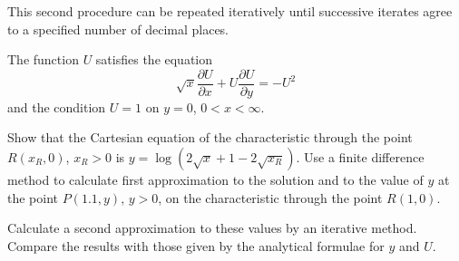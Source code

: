 \documentclass[../main-sheet.tex]{subfiles}
\begin{document}
This second procedure can be repeated iteratively until successive iterates agree to a specified number of decimal places.
\begin{ex}
    The function \(U\) satisfies the equation
    \[\sqrt{x}\frac{\partial U}{\partial x}+U\frac{\partial U}{\partial y}=-U^2\]
    and the condition \(U=1\) on \(y=0\), \(0<x<\infty\).
    
    Show that the Cartesian equation of the characteristic through the point \(R(x_R,0)\), \(x_R>0\) is \(y=\log(2\sqrt{x}+1-2\sqrt{x_R})\). Use a finite difference method to calculate first approximation to the solution and to the value of \(y\) at the point \(P(1.1,y)\), \(y>0\), on the characteristic through the point \(R(1,0)\).
    
    Calculate a second approximation to these values by an iterative method. Compare the results with those given by the analytical formulae for \(y\) and \(U\).
\end{ex}
\end{document}
